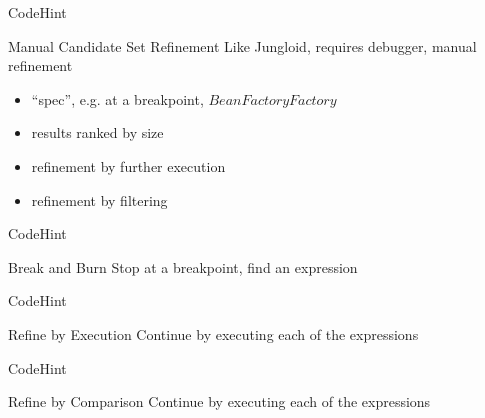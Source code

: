 \begin{frame}{CodeHint}
  \begin{block}{Manual Candidate Set Refinement}
    Like Jungloid, requires debugger, manual refinement

    \begin{itemize}
      \item ``spec'', e.g. at a breakpoint, $BeanFactoryFactory$
      \item results ranked by size
      \item refinement by further execution
      \item refinement by filtering
    \end{itemize}
  \end{block}
\end{frame}

\begin{frame}{CodeHint}
  \begin{block}{Break and Burn}
    Stop at a breakpoint, find an expression

    \begin{example}
      
    \end{example}
  \end{block}
\end{frame}

\begin{frame}{CodeHint}
  \begin{block}{Refine by Execution}
    Continue by executing each of the expressions

    \begin{example}
      
    \end{example}
  \end{block}
\end{frame}

\begin{frame}{CodeHint}
  \begin{block}{Refine by Comparison}
    Continue by executing each of the expressions

    \begin{example}
      
    \end{example}
  \end{block}
\end{frame}

